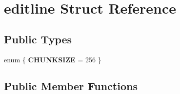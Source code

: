 \hypertarget{structeditline}{}\section{editline Struct Reference}
\label{structeditline}
\subsection*{Public Types}
\begin{DoxyCompactItemize}
\item 
\mbox{\label{structeditline_a3d4a39e526697d6f73dcfeede8245545}} 
enum \{ {\bfseries C\+H\+U\+N\+K\+S\+I\+ZE} = 256
 \}
\end{DoxyCompactItemize}
\subsection*{Public Member Functions}
